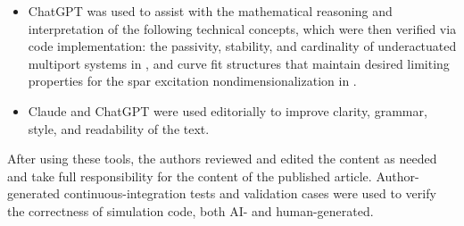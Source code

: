 \documentclass[a4paper,fleqn,colorlinks,unicode,lineno]{cas-dc} %
\makeatletter
\newcommand{\JOURNALTWOCOLUMN}{} %
\providecommand{\DIFdeltex}[1]{{\protect\color{red}\sout{#1}}} %
\providecommand{\DIFaddbegin}{} %
\providecommand{\DIFaddend}{} %
\providecommand{\DIFdelbegin}{} %
\providecommand{\DIFdelend}{} %
\providecommand{\DIFdel}[1]{\texorpdfstring{\DIFdeltex{#1}}{}} %
\providecommand{\DIFscaledelfig}{0.5}
\newlength{\DIFdelgraphicswidth} %
\newlength{\DIFdelgraphicsheight} %
\providecommand{\DIFaddincludegraphics}[2][]{{\color{blue}\fbox{\DIFOincludegraphics[#1]{#2}}}} %
\providecommand{\DIFdelincludegraphics}[2][]{%
\sbox{\DIFdelgraphicsbox}{\DIFOincludegraphics[#1]{#2}}%
\settoboxwidth{\DIFdelgraphicswidth}{\DIFdelgraphicsbox} %
\settoboxtotalheight{\DIFdelgraphicsheight}{\DIFdelgraphicsbox} %
\scalebox{\DIFscaledelfig}{%
\parbox[b]{\DIFdelgraphicswidth}{\usebox{\DIFdelgraphicsbox}\\[-\baselineskip] \rule{\DIFdelgraphicswidth}{0em}}\llap{\resizebox{\DIFdelgraphicswidth}{\DIFdelgraphicsheight}{%
\setlength{\unitlength}{\DIFdelgraphicswidth}%
\begin{picture}(1,1)%
\thicklines\linethickness{2pt} %
{\color[rgb]{1,0,0}\put(0,0){\framebox(1,1){}}}%
{\color[rgb]{1,0,0}\put(0,0){\line( 1,1){1}}}%
{\color[rgb]{1,0,0}\put(0,1){\line(1,-1){1}}}%
\end{picture}%
}\hspace*{3pt}}} %
} %
\DeclareRobustCommand{\DIFaddbegin}{\DIFOaddbegin \let\includegraphics\DIFaddincludegraphics} %
\DeclareRobustCommand{\DIFaddend}{\DIFOaddend \let\includegraphics\DIFOincludegraphics} %
\DeclareRobustCommand{\DIFdelbegin}{\DIFOdelbegin \let\includegraphics\DIFdelincludegraphics} %
\DeclareRobustCommand{\DIFdelend}{\DIFOaddend \let\includegraphics\DIFOincludegraphics} %
\let\sout@orig\sout %
\renewcommand{\sout}[1]{\ifmmode\text{\sout@orig{\ensuremath{#1}}}\else\sout@orig{#1}\fi} %
\makeatother
\begin{document}
\begin{itemize}[leftmargin=*]
the drag integral limit formulas in ;
the circle/ellipse intersection formulas in ;
the sensitivity formulas for the \DIFdelbegin \DIFdel{PTO }\DIFdelend \DIFaddbegin \gls{acr-pto} \DIFaddend limit in ;
the curvature of the function in ;
the trigonometric simplifications in the slamming angle formula in .
\item ChatGPT was used to assist with the mathematical reasoning and interpretation of the following technical concepts, which were then verified via code implementation: the passivity, stability, and cardinality of underactuated multiport systems in , and curve fit structures that maintain desired limiting properties for the spar excitation nondimensionalization in .
\item Claude and ChatGPT were used editorially to improve clarity, grammar, style, and readability of the text.
\end{itemize}
After using these tools, the authors reviewed and edited the content as needed and take full responsibility for the content of the published article.
Author-generated continuous-integration tests and validation cases were used to verify the correctness of simulation code, both AI- and human-generated.


\appendix
\DIFaddbegin 

\DIFaddend \ifdefined\JOURNALTWOCOLUMN
    \onecolumn%
\fi

 \newpage %
\end{document}
